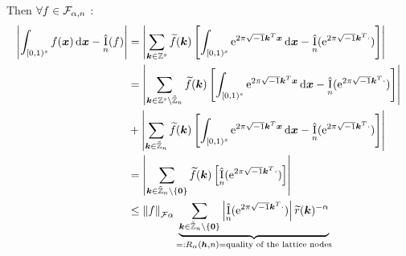 \documentclass{amsart}
\newcommand{\tr}{\widetilde{r}}
\newcommand{\appxintn}{\appxint_n}
\DeclareMathOperator{\appxint}{\hat{I}}
\begin{document}
Then $\forall f \in \mathcal{F}_{\alpha,n}$ :
\begin{align} \label{eq:wcerrRalpha}
\abs{\int_{[0,1)^s} f(\vx) \, \dif \vx - \appxint_n(f)} &
= \abs{\sum_{\vk \in \integers^s} \tf(\vk) \left[\int_{[0,1)^s} \me^{2 \pi \sqrt{-1} \vk^T \vx} \, \dif \vx - \appxintn(\me^{2 \pi \sqrt{-1} \vk^T \cdot})\right]} \\
\nonumber
&= \abs{\sum_{\vk \in \integers^s \setminus\tilde \integers_n} \tf(\vk) \left[\int_{[0,1)^s} \me^{2 \pi \sqrt{-1} \vk^T \vx} \, \dif \vx - \appxintn(\me^{2 \pi \sqrt{-1} \vk^T \cdot})\right]} \\
\nonumber
&+ \abs{\sum_{\vk \in \tilde \integers_n} \tf(\vk) \left[\int_{[0,1)^s} \me^{2 \pi \sqrt{-1} \vk^T \vx} \, \dif \vx - \appxintn(\me^{2 \pi \sqrt{-1} \vk^T \cdot})\right]} \\
\nonumber
& = \abs{\sum_{\vk \in \tilde\integers_n\setminus\{\vzero\}} \tf(\vk) \left[ \appxintn(\me^{2 \pi \sqrt{-1} \vk^T \cdot})\right]} \\
\nonumber
& \le \norm[\cf{\alpha}]{f} \underbrace{\sum_{\vk \in \tilde \integers_n \setminus\{\vzero\}} \abs{\appxint_n(\me^{2 \pi \sqrt{-1} \vk^T \cdot})}\tr(\vk)^{-\alpha}}_{=: R_\alpha(\vh,n) = \text{quality of the lattice nodes}} \\
\nonumber
\end{align}
\end{document}
